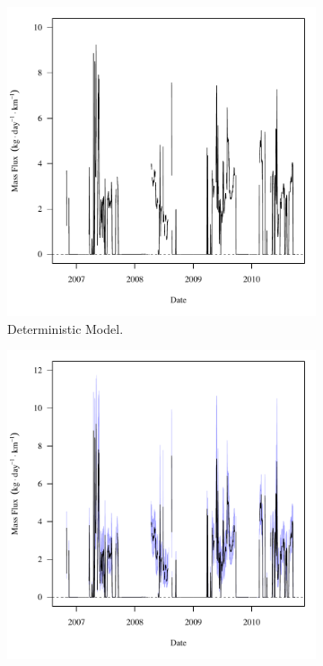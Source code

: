 \begin{linenumbers}
\begin{landscape}
\begin{figure}
\begin{subfigure}{0.7\textwidth}
			\includegraphics[width=\tableCustomSize]{"Figures/Results_USR/Deterministic/f HOL"}
			\caption{Deterministic Model.}
		\end{subfigure}%
		\begin{subfigure}{0.7\textwidth}
			\centering
			\includegraphics[width=\tableCustomSize]{"Figures/Results_USR/Stochastic/f HOL"}

\end{subfigure}
\end{figure}
\end{landscape}
\end{linenumbers}
